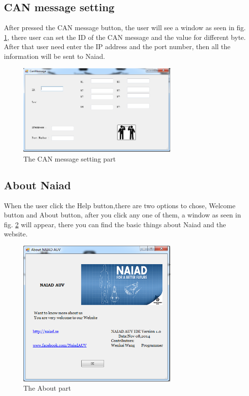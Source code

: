 \subsection{CAN message setting}
After pressed the CAN message button, the user will see a window as seen in fig. \ref{IDE_overall_design5}, there user can set the ID of the CAN message and the value for different byte. After that user need enter the IP address and the port number, then all the information will be sent to Naiad.
\begin{figure}[!ht]
	\begin{center}
		\includegraphics[width=80mm]{./Images/Software/CANmessage_part.png}
		\caption{The CAN message setting part}
		\label{IDE_overall_design5}
	\end{center}
\end{figure}
\subsection{About Naiad}
When the user click the Help button,there are two options to chose, Welcome button and About button, after you click any one of them, a window as seen in fig. \ref{IDE_overall_design6} will appear, there you can find the basic things about Naiad and the website.
\begin{figure}[!ht]
	\begin{center}
		\includegraphics[width=80mm]{./Images/Software/about_part.png}
		\caption{The About part}
		\label{IDE_overall_design6}
	\end{center}
\end{figure}